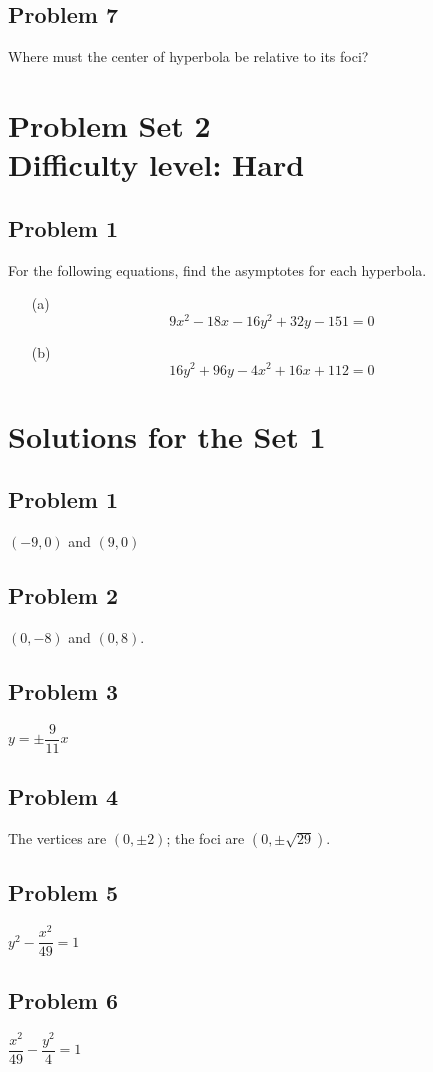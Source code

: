 \documentclass[12pt]{article}
\begin{document}
\subsection*{Problem 7}
Where must the center of hyperbola be relative to its foci?

\section*{Problem Set 2\\Difficulty level: Hard}
\subsection*{Problem 1}
For the following equations, find the asymptotes for each hyperbola.
\begin{enumerate}
    \item[(a)] \[9x^2-18x-16y^2+32y-151=0\]
    \item[(b)] \[16y^2+96y-4x^2+16x+112=0\]
\end{enumerate}

\newpage
\section*{Solutions for the Set 1}
\subsection*{Problem 1}
\((-9,0)\) and \((9,0)\)
\subsection*{Problem 2}
\((0,-8)\) and \((0,8)\).
\subsection*{Problem 3}
\(y=\pm \dfrac{9}{11}x\)
\subsection*{Problem 4}
The vertices are \((0,\pm 2)\); the foci are \((0, \pm \sqrt{29})\).
\subsection*{Problem 5}
\(y^2-\dfrac{x^2}{49}=1\)
\subsection*{Problem 6}
\(\dfrac{x^2}{49}-\dfrac{y^2}{4}=1\)
\end{document}
